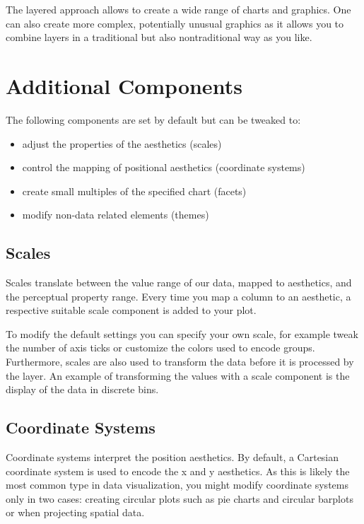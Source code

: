 \documentclass[
]{krantz}
\providecommand{\tightlist}{%
  \setlength{\itemsep}{0pt}\setlength{\parskip}{0pt}}
\begin{document}
The layered approach allows to create a wide range of charts and graphics. One can also create more complex, potentially unusual graphics as it allows you to combine layers in a traditional but also nontraditional way as you like.

\hypertarget{additional-components}{%
\section{Additional Components}\label{additional-components}}

The following components are set by default but can be tweaked to:

\begin{itemize}
\tightlist
\item
  adjust the properties of the aesthetics (scales)
\item
  control the mapping of positional aesthetics (coordinate systems)
\item
  create small multiples of the specified chart (facets)
\item
  modify non-data related elements (themes)
\end{itemize}

\hypertarget{scales}{%
\subsection{Scales}\label{scales}}

Scales translate between the value range of our data, mapped to aesthetics, and the perceptual property range. Every time you map a column to an aesthetic, a respective suitable scale component is added to your plot.

To modify the default settings you can specify your own scale, for example tweak the number of axis ticks or customize the colors used to encode groups. Furthermore, scales are also used to transform the data before it is processed by the layer. An example of transforming the values with a scale component is the display of the data in discrete bins.

\hypertarget{coords}{%
\subsection{Coordinate Systems}\label{coords}}

Coordinate systems interpret the position aesthetics. By default, a Cartesian coordinate system is used to encode the x and y aesthetics. As this is likely the most common type in data visualization, you might modify coordinate systems only in two cases: creating circular plots such as pie charts and circular barplots or when projecting spatial data.
\end{document}
